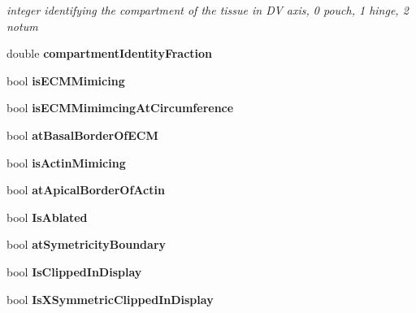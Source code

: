 \begin{DoxyCompactItemize}
\begin{DoxyCompactList}\small\item\em integer identifying the compartment of the tissue in D\+V axis, 0 pouch, 1 hinge, 2 notum \end{DoxyCompactList}\item 
\hypertarget{classShapeBase_aada8d021521dbe6815a887bc0cb28cc8}{}double {\bfseries compartment\+Identity\+Fraction}\label{classShapeBase_aada8d021521dbe6815a887bc0cb28cc8}

\item 
\hypertarget{classShapeBase_a5e442b31d2341cbe477d7c33195a576c}{}bool {\bfseries is\+E\+C\+M\+Mimicing}\label{classShapeBase_a5e442b31d2341cbe477d7c33195a576c}

\item 
\hypertarget{classShapeBase_aa25330a1d76d3ada08bd0dced22fb79b}{}bool {\bfseries is\+E\+C\+M\+Mimimcing\+At\+Circumference}\label{classShapeBase_aa25330a1d76d3ada08bd0dced22fb79b}

\item 
\hypertarget{classShapeBase_afcd1d4807f83e12b2df7606acb7518b3}{}bool {\bfseries at\+Basal\+Border\+Of\+E\+C\+M}\label{classShapeBase_afcd1d4807f83e12b2df7606acb7518b3}

\item 
\hypertarget{classShapeBase_a892e478508ed8a375f0816b330e36ac1}{}bool {\bfseries is\+Actin\+Mimicing}\label{classShapeBase_a892e478508ed8a375f0816b330e36ac1}

\item 
\hypertarget{classShapeBase_a95c9fe02c9c42e0617900c3282e4403a}{}bool {\bfseries at\+Apical\+Border\+Of\+Actin}\label{classShapeBase_a95c9fe02c9c42e0617900c3282e4403a}

\item 
\hypertarget{classShapeBase_a4f09d39d079bfe95ea7c25f5d3de6c09}{}bool {\bfseries Is\+Ablated}\label{classShapeBase_a4f09d39d079bfe95ea7c25f5d3de6c09}

\item 
\hypertarget{classShapeBase_a3d15f14d23230682242ed063872617af}{}bool {\bfseries at\+Symetricity\+Boundary}\label{classShapeBase_a3d15f14d23230682242ed063872617af}

\item 
\hypertarget{classShapeBase_a6f5e25bc9b4376c0aa28aec59af6cf2f}{}bool {\bfseries Is\+Clipped\+In\+Display}\label{classShapeBase_a6f5e25bc9b4376c0aa28aec59af6cf2f}

\item 
\hypertarget{classShapeBase_ad58b945ab4de36d2ab56b8a33fd10c20}{}bool {\bfseries Is\+X\+Symmetric\+Clipped\+In\+Display}\label{classShapeBase_ad58b945ab4de36d2ab56b8a33fd10c20}


\end{DoxyCompactItemize}
